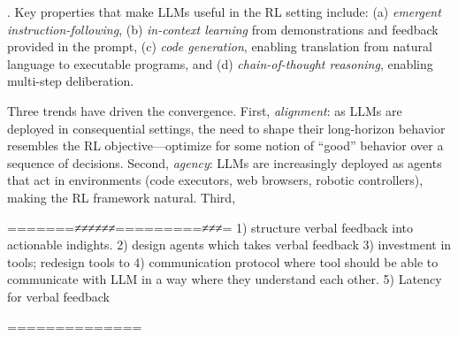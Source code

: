. Key properties that make LLMs useful in the RL setting
include: (a) \emph{emergent instruction-following}, (b) \emph{in-context
learning} from demonstrations and feedback provided in the prompt,
(c) \emph{code generation}, enabling translation from natural language to
executable programs, and (d) \emph{chain-of-thought reasoning}, enabling
multi-step deliberation.


 Three trends have driven the convergence. First, \emph{alignment}: as LLMs
are deployed in consequential settings, the need to shape their long-horizon
behavior resembles the RL objective---optimize for some notion of ``good''
behavior over a sequence of decisions. Second, \emph{agency}: LLMs are
increasingly deployed as agents that act in environments (code executors, web
browsers, robotic controllers), making the RL framework natural. Third,

=======≠≠≠≠≠≠=========≠≠≠=
1) structure verbal feedback into actionable indights. 
2) design agents which takes verbal feedback
3) investment in tools; redesign tools to
4) communication protocol where tool should be able to communicate with LLM in a way where they understand each other. 
5) Latency for verbal feedback

==============
